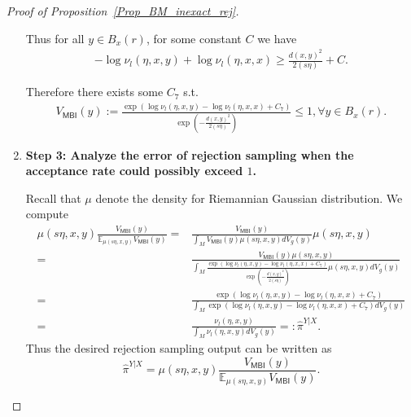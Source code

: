\begin{proof}[Proof of Proposition~\ref{Prop_BM_inexact_rej}]
\begin{enumerate}
        Thus for all $y \in B_{x}(r)$, for some constant $C$ we have 
        \begin{align*}
                - \log \nu_{l}(\eta, x, y) + \log \nu_{l}(\eta, x, x) 
                \ge \frac{d(x, y)^{2}}{2(s\eta)} + C.
        \end{align*}
    
        Therefore there exists some $C_{7}$ s.t. 
        \begin{align*}
            V_{\mathsf{MBI}}(y) := \frac{\exp(\log \nu_{l}(\eta, x, y) - \log \nu_{l}(\eta, x, x) + C_{7})}{\exp(-\frac{d(x, y)^{2}}{2(s\eta)})} \le 1, \forall y \in B_{x}(r).
        \end{align*}
        \item \textbf{Step 3:  Analyze the error of rejection sampling when the acceptance rate could possibly exceed $1$. }
        
        Recall that $\mu$ denote the density for Riemannian Gaussian distribution. 
        We compute 
        \begin{align*}
                \mu(s\eta, x, y) \frac{V_{\mathsf{MBI}}(y)}{\mathbb{E}_{\mu(s\eta, x, y)} V_{\mathsf{MBI}}(y)} 
                =& \frac{V_{\mathsf{MBI}}(y)}{\int_{M} V_{\mathsf{MBI}}(y) \mu(s\eta, x, y) dV_{g}(y)} \mu(s\eta, x, y)\\
                = & \frac{V_{\mathsf{MBI}}(y)\mu(s\eta, x, y) }{\int_{M}  \frac{\exp(\log \nu_{l}(\eta, x, y) - \log \nu_{l}(\eta, x, x) + C_{7})}{\exp(-\frac{d(x, y)^{2}}{2(s\eta)})} \mu(s\eta, x, y) dV_{g}(y)} \\
                = &\frac{\exp(\log \nu_{l}(\eta, x, y) - \log \nu_{l}(\eta, x, x) + C_{7}) }{\int_{M} \exp(\log \nu_{l}(\eta, x, y) - \log \nu_{l}(\eta, x, x) + C_{7}) dV_{g}(y)} \\
                = & \frac{\nu_{l}(\eta, x, y)}{\int_{M} \nu_{l}(\eta, x, y) dV_{g}(y)}
                =: \hat{\pi}^{Y|X}.
        \end{align*}
        Thus the desired rejection sampling output can be written as $$\hat{\pi}^{Y|X} = \mu(s\eta, x, y) \frac{V_{\mathsf{MBI}}(y)}{\mathbb{E}_{\mu(s\eta, x, y)} V_{\mathsf{MBI}}(y)}.$$ 
        

\end{enumerate}
\end{proof}
